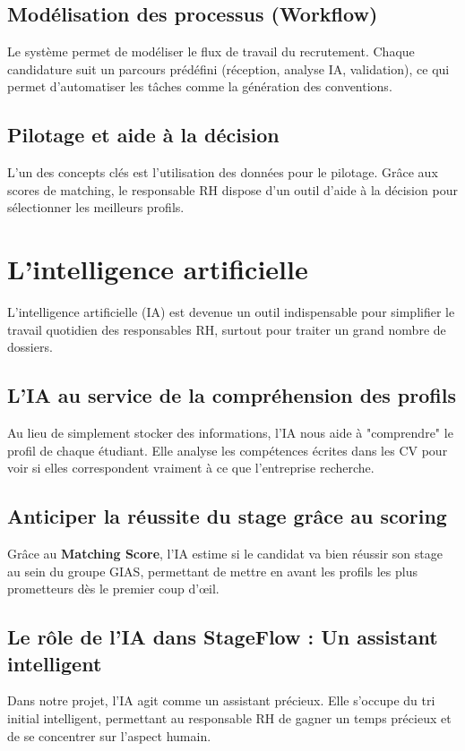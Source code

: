 \subsection{Modélisation des processus (Workflow)}
Le système permet de modéliser le flux de travail du recrutement. Chaque candidature suit un parcours prédéfini (réception, analyse IA, validation), ce qui permet d'automatiser les tâches comme la génération des conventions.

\subsection{Pilotage et aide à la décision}
L'un des concepts clés est l'utilisation des données pour le pilotage. Grâce aux scores de matching, le responsable RH dispose d'un outil d'aide à la décision pour sélectionner les meilleurs profils.

\section{L'intelligence artificielle}
L'intelligence artificielle (IA) est devenue un outil indispensable pour simplifier le travail quotidien des responsables RH, surtout pour traiter un grand nombre de dossiers.

\subsection{L'IA au service de la compréhension des profils}
Au lieu de simplement stocker des informations, l'IA nous aide à "comprendre" le profil de chaque étudiant. Elle analyse les compétences écrites dans les CV pour voir si elles correspondent vraiment à ce que l'entreprise recherche.

\subsection{Anticiper la réussite du stage grâce au scoring}
Grâce au \textbf{Matching Score}, l'IA estime si le candidat va bien réussir son stage au sein du groupe GIAS, permettant de mettre en avant les profils les plus prometteurs dès le premier coup d'œil.

\subsection{Le rôle de l'IA dans StageFlow : Un assistant intelligent}
Dans notre projet, l'IA agit comme un assistant précieux. Elle s'occupe du tri initial intelligent, permettant au responsable RH de gagner un temps précieux et de se concentrer sur l'aspect humain.

